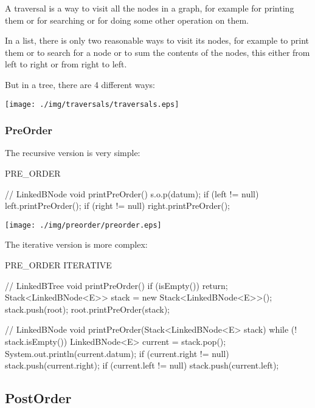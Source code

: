 \documentclass[a4paper, 9pt]{extarticle}
\begin{document}
A traversal is a way to visit all the nodes in a graph, for example for
printing them or for searching or for doing some other operation on them.

In a list, there is only two reasonable ways to visit its nodes,
for example to print them
or to search for a node
or to sum the contents of the nodes,
this either from left to right or from right to left.

But in a tree, there are 4 different ways:



\begin{center}
  \texttt{[image: ./img/traversals/traversals.eps]}
\end{center}


\subsubsection{PreOrder}

The recursive version is very simple:

\begin{multicols}{2}
\begin{blackboard}
      PRE_ORDER

// LinkedBNode
void printPreOrder() {
  s.o.p(datum);
  if (left != null) {
    left.printPreOrder();
  }
  if (right != null) {
    right.printPreOrder();
  }
}
\end{blackboard}
\columnbreak
\texttt{[image: ./img/preorder/preorder.eps]}
\end{multicols}

The iterative version is more complex:

\begin{blackboard}
      PRE_ORDER ITERATIVE

// LinkedBTree
void printPreOrder() {
  if (isEmpty()) {
    return;
  }
  Stack<LinkedBNode<E>> stack =
                   new Stack<LinkedBNode<E>>();
  stack.push(root);
  root.printPreOrder(stack);
}

// LinkedBNode
void printPreOrder(Stack<LinkedBNode<E> stack) {
  while (! stack.isEmpty()) {
    LinkedBNode<E> current = stack.pop();
    System.out.println(current.datum);
    if (current.right != null) {
      stack.push(current.right);
    }
    if (current.left != null) {
      stack.push(current.left);
    }
  }
}
\end{blackboard}

\subsection{PostOrder}
\end{document}
